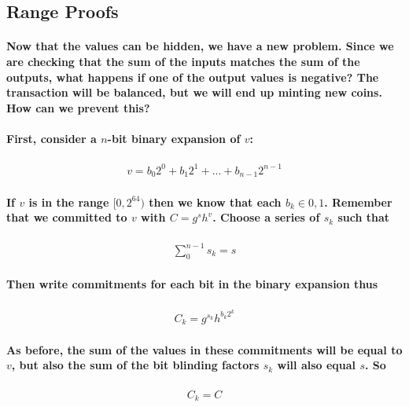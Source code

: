 \documentclass{article}
\begin{document}
\subsection{Range Proofs}

\paragraph{Now that the values can be hidden, we have a new problem.  Since we are checking that the sum of the inputs matches the sum of the outputs, what happens if one of the output values is negative?  The transaction will be balanced, but we will end up minting new coins.  How can we prevent this?}

\paragraph{First, consider a $n$-bit binary expansion of $v$:}

\begin{eqnarray}
  v = b_0 2^0 + b_1 2^1 + ... + b_{n-1} 2^{n-1}
\end{eqnarray}

\paragraph{If $v$ is in the range $[0, 2^{64})$ then we know that each $b_k \in {0, 1}$.  Remember that we committed to $v$ with $C = g^s h^v$.  Choose a series of $s_k$ such that}

\begin{eqnarray}
  \sum_0^{n-1} s_k = s 
\end{eqnarray}

\paragraph{Then write commitments for each bit in the binary expansion thus}

\begin{eqnarray}
  C_k = g^{s_k} h^{b_k 2^k}
\end{eqnarray}

\paragraph{As before, the sum of the values in these commitments will be equal to $v$, but also the sum of the bit blinding factors $s_k$ will also equal $s$.  So}

\begin{eqnarray}
  C_k = C
\end{eqnarray}
\end{document}

